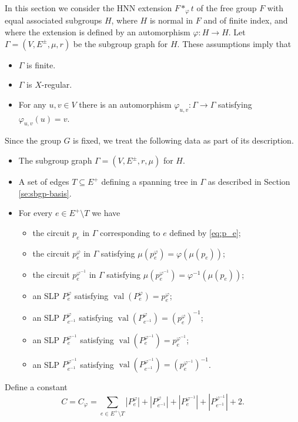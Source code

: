 \documentclass[12pt,oneside]{amsart}
\theoremstyle{definition}
\theoremstyle{case}
\DeclareMathOperator{\val}{val}
\begin{document}
In this section we consider the HNN extension $F \ast_\varphi t$
of the free group $F$ with equal associated subgroups $H$,
where $H$ is normal in $F$ and of finite index, and where the extension
is defined by an automorphism $\varphi \colon H \to H$.
Let $\Gamma=(V,E^\pm,\mu,r)$ be the subgroup graph for $H$.
These assumptions imply that
\begin{itemize}
\item 
$\Gamma$ is finite.
\item 
$\Gamma$ is $X$-regular.
\item 
For any $u,v\in V$ there is an automorphism $\varphi_{u,v}:\Gamma\to\Gamma$ 
satisfying $\varphi_{u,v}(u) = v$.
\end{itemize}
Since the group $G$ is fixed, we treat the following data as part 
of its description.
\begin{itemize}
\item 
The subgroup graph $\Gamma=(V,E^\pm,r,\mu)$ for $H$.
\item 
A set of edges $T\subseteq E^+$ defining a
spanning tree in $\Gamma$ as described in Section \ref{se:sbgp-basis}.
\item 
For every $e\in E^+\setminus T$ we have
\begin{itemize}
\item 
the circuit $p_e$ in $\Gamma$ corresponding to $e$ defined by \eqref{eq:p_e};
\item 
the circuit $p_e^\varphi$ in $\Gamma$ satisfying 
$\mu(p_e^\varphi) = \varphi(\mu(p_e))$;
\item 
the circuit $p_e^{\varphi^{-1}}$ in $\Gamma$ satisfying
$\mu(p_e^{\varphi^{-1}}) = \varphi^{-1}(\mu(p_e))$;
\item 
an SLP $P_e^\varphi$ satisfying
$\val(P_e^\varphi) = p_e^\varphi$;
\item 
an SLP $P_{e^{-1}}^\varphi$ satisfying
$\val(P_{e^{-1}}^\varphi) = (p_e^\varphi)^{-1}$;
\item 
an SLP $P_e^{\varphi^{-1}}$ satisfying
$\val(P_e^{\varphi^{-1}}) = p_e^{\varphi^{-1}}$;
\item 
an SLP $P_{e^{-1}}^{\varphi^{-1}}$ satisfying
$\val(P_{e^{-1}}^{\varphi^{-1}}) = (p_e^{\varphi^{-1}})^{-1}$.
\end{itemize}
\end{itemize}
Define a constant
\begin{equation}\label{eq:C}
C = C_\varphi =
\sum_{e\in E^+\setminus T}
|P_e^\varphi|+
|P_{e^{-1}}^\varphi|+
|P_e^{\varphi^{-1}}|+
|P_{e^{-1}}^{\varphi^{-1}}| +2.
\end{equation}
\end{document}
